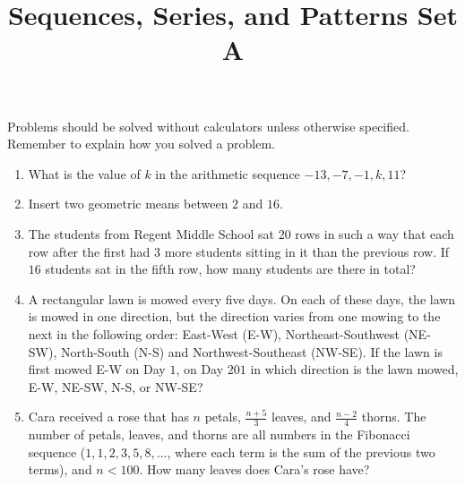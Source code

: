 \documentclass{article}
\title{Sequences, Series, and Patterns Set A}
\date{}
\author{}
\begin{document}
    \maketitle
    \noindent Problems should be solved without calculators unless otherwise
    specified. Remember to explain how you solved a problem.
    \begin{enumerate}
        \item What is the value of $k$ in the arithmetic sequence $-13, -7, -1,
        k, 11$?
        \vspace{3cm}
        \item Insert two geometric means between $2$ and $16$.
        \vspace{3cm}
        \item The students from Regent Middle School sat $20$ rows in such a way
        that each row after the first had $3$ more students sitting in it than
        the previous row. If $16$ students sat in the fifth row, how many
        students are there in total?
        \vspace{3cm}
        \item A rectangular lawn is mowed every five days. On each of these
        days, the lawn is mowed in one direction, but the direction varies from
        one mowing to the next in the following order: East-West (E-W),
        Northeast-Southwest (NE-SW), North-South (N-S) and Northwest-Southeast
        (NW-SE). If the lawn is first mowed E-W on Day $1$, on Day $201$ in
        which direction is the lawn mowed, E-W, NE-SW, N-S, or NW-SE?
        \vspace{3cm}
        \item Cara received a rose that has $n$ petals, $\frac{n + 5}{3}$
        leaves, and $\frac{n - 2}{4}$ thorns. The number of petals, leaves, and
        thorns are all numbers in the Fibonacci sequence ($1, 1, 2, 3, 5, 8,
        \dots$, where each term is the sum of the previous two terms), and $n < 100$. How many leaves does Cara's rose have?
        \vspace{3cm}
    \end{enumerate}
\end{document}
